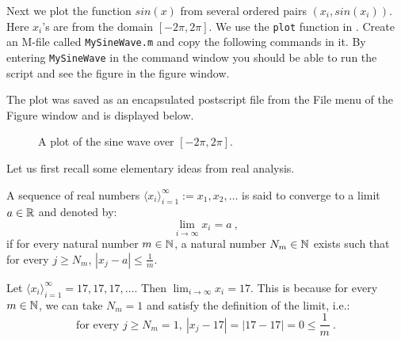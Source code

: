 \begin{labwork}\label{LW:2Dplot}
Next we plot the function $sin(x)$ from several ordered pairs $(x_i,sin(x_i))$.  Here $x_i$'s are from the domain $[-2 \pi, 2 \pi]$.  We use the {\tt plot} function in \Matlab.  Create an M-file called {\tt MySineWave.m} and copy the following commands in it.  By entering {\tt MySineWave} in the command window you should be able to run the script and see the figure in the figure window.


The plot was saved as an encapsulated postscript file from the File menu of the Figure window and is displayed below.
\begin{figure}[ht]
\vspace{2cm}
\caption{A plot of the sine wave over $[-2 \pi, 2 \pi]$.\label{F:sinfunction}}
\end{figure}
\end{labwork}





Let us first recall some elementary ideas from real analysis.
\begin{definition}
A sequence of real numbers  $\langle x_i \rangle_{i=1}^{\infty} := x_1,x_2,\ldots$ is said to converge to a limit $a \in \mathbb{R}$ and denoted by:
\[
\lim_{i \to \infty} x_i = a \ ,
\]
if for every natural number $m \in \mathbb{N}$, a natural number $N_m \in \mathbb{N}$ exists such that for every $j \geq N_m$, $|x_j-a| \leq \frac{1}{m}$.
\end{definition}

\begin{example}
Let $\langle x_i \rangle_{i=1}^{\infty} = 17, 17, 17, \ldots$. Then $\lim_{i \to \infty} x_i = 17$.  This is because for every  $m \in \mathbb{N}$, we can take $N_m=1$ and satisfy the definition of the limit, i.e.:
\[
\text{for every }  j \geq N_m= 1, \  |x_j-17|=|17-17|=0\leq \frac{1}{m} \ .
\]
\end{example}

